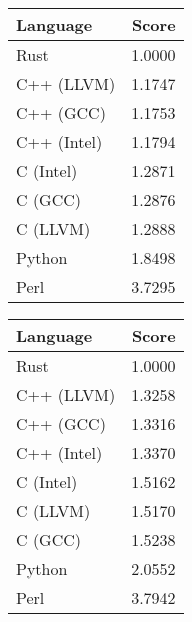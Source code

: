 \begin{subtable}{0.33\textwidth}
    \centering
    \caption{$k=3$}
    \label{table:runtime:regexp(3)}
    \begin{tabular}{|l|r|}
        \hline
        Language & Score \\
        \hline
        Rust & 1.0000 \\
        C++ (LLVM) & 1.1747 \\
        C++ (GCC) & 1.1753 \\
        C++ (Intel) & 1.1794 \\
        C (Intel) & 1.2871 \\
        C (GCC) & 1.2876 \\
        C (LLVM) & 1.2888 \\
        Python & 1.8498 \\
        Perl & 3.7295 \\
        \hline
    \end{tabular}
\end{subtable}
\begin{subtable}{0.33\textwidth}
    \centering
    \caption{$k=4$}
    \label{table:runtime:regexp(4)}
    \begin{tabular}{|l|r|}
        \hline
        Language & Score \\
        \hline
        Rust & 1.0000 \\
        C++ (LLVM) & 1.3258 \\
        C++ (GCC) & 1.3316 \\
        C++ (Intel) & 1.3370 \\
        C (Intel) & 1.5162 \\
        C (LLVM) & 1.5170 \\
        C (GCC) & 1.5238 \\
        Python & 2.0552 \\
        Perl & 3.7942 \\
        \hline
    \end{tabular}
\end{subtable}%
